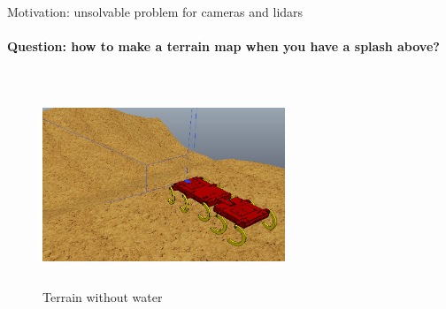 \documentclass[aspectratio=169]{beamer}
\begin{document}
\begin{frame}[t]{Motivation: unsolvable problem for cameras and lidars}
    \framesubtitle{Question: how to make a terrain map when you have a splash above?}
    \vspace{-1cm}
    \begin{columns}[T,onlytextwidth]
        \begin{column}{0.55\textwidth}


            \begin{figure}[H]
                \centering\includegraphics[height=6cm,width=1\textwidth,keepaspectratio]{terrain_wo_water.png}
                \caption*{Terrain without water}
            \end{figure}
        \end{column}
        \begin{column}{0.44\textwidth}
            \begin{figure}[H]
                \begin{subfigure}[b]{0.9\textwidth}
                    \centering
\end{subfigure}
\end{figure}
\end{column}
\end{columns}
\end{frame}
\end{document}
